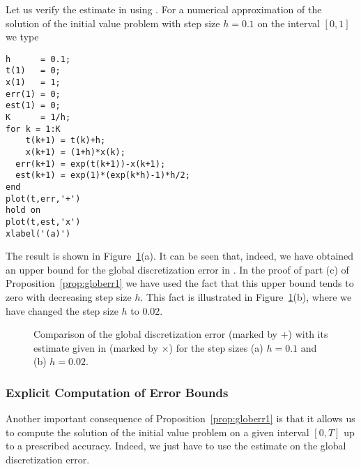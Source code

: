 \documentclass{ximera}
\begin{document}
Let us verify the estimate in  using \Matlabp.  For a
numerical approximation of the solution of the initial value problem 
 with step size $h=0.1$ on the interval $[0,1]$
we type
\begin{verbatim}
h      = 0.1;
t(1)   = 0;
x(1)   = 1;
err(1) = 0;
est(1) = 0;
K      = 1/h;
for k = 1:K
    t(k+1) = t(k)+h;
    x(k+1) = (1+h)*x(k);
  err(k+1) = exp(t(k+1))-x(k+1);
  est(k+1) = exp(1)*(exp(k*h)-1)*h/2;
end
plot(t,err,'+')
hold on
plot(t,est,'x')
xlabel('(a)')
\end{verbatim}
The result is shown in Figure~\ref{fig:globerr1}(a).
It can be seen that, indeed, we have
obtained an upper bound for the global discretization error in
.  In the proof of part (c) of Proposition~\ref{prop:globerr1}
we have used the fact that this upper bound tends to zero with decreasing 
step size $h$.  This fact is illustrated in Figure~\ref{fig:globerr1}(b),
where we have changed the step size $h$ to $0.02$.
\begin{figure}[htb]
   \centerline{%
   }
   \caption{Comparison of the global discretization error (marked by
   $+$) with its estimate given in \protect{} 
   (marked by $\times$) for the step sizes (a) $h=0.1$ and 
   (b) $h=0.02$.}
   \label{fig:globerr1}
\end{figure}

\subsubsection*{Explicit Computation of Error Bounds}

Another important consequence of Proposition~\ref{prop:globerr1} is
that it allows us to compute the solution of the initial value
problem  on a given interval $[0,T]$ up to a
prescribed accuracy.  Indeed, we just have to use the estimate
 on the global discretization error.  
\end{document}
